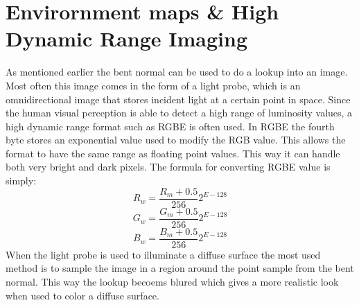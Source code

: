 \section{Envirornment maps \& High Dynamic Range Imaging}
\label{sec:environment_maps}
As mentioned earlier the bent normal can be used to do a lookup into an image. Most often this image comes in the form of a light probe, which is an omnidirectional image that stores incident light at a certain point in space. Since the human visual perception is able to detect a high range of luminosity values, a high dynamic range format such as RGBE is often used. In RGBE the fourth byte stores an exponential value used to modify the RGB value. This allows the format to have the same range as floating point values. This way it can handle both very bright and dark pixels. The formula for converting RGBE value is simply:
\[
R_w = \frac{R_m + 0.5}{256} 2^{E-128} \]\[
G_w = \frac{G_m + 0.5}{256} 2^{E-128} \]\[
B_w = \frac{B_m + 0.5}{256} 2^{E-128} \]\[
\]
When the light probe is used to illuminate a diffuse surface the most used method is to sample the image in a region around the point sample from the bent normal. This way the lookup becoems blured which gives a more realistic look when used to color a diffuse surface\cite{Landis2002}.
